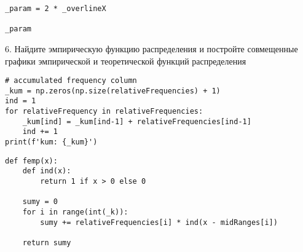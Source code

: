 \documentclass[a4paper, 14pt]{extarticle}
\begin{document}
\begin{lstlisting}
_param = 2 * _overlineX

_param
\end{lstlisting}

\begin{center}
    6. Найдите эмпирическую функцию распределения и постройте совмещенные 
    графики эмпирической и теоретической функций распределения
\end{center}

\begin{lstlisting}
# accumulated frequency column
_kum = np.zeros(np.size(relativeFrequencies) + 1)
ind = 1 
for relativeFrequency in relativeFrequencies:
    _kum[ind] = _kum[ind-1] + relativeFrequencies[ind-1]
    ind += 1
print(f'kum: {_kum}')
\end{lstlisting}

\begin{lstlisting}
def femp(x):
    def ind(x):
        return 1 if x > 0 else 0

    sumy = 0 
    for i in range(int(_k)):
        sumy += relativeFrequencies[i] * ind(x - midRanges[i])
    
    return sumy
\end{lstlisting}
\end{document}

